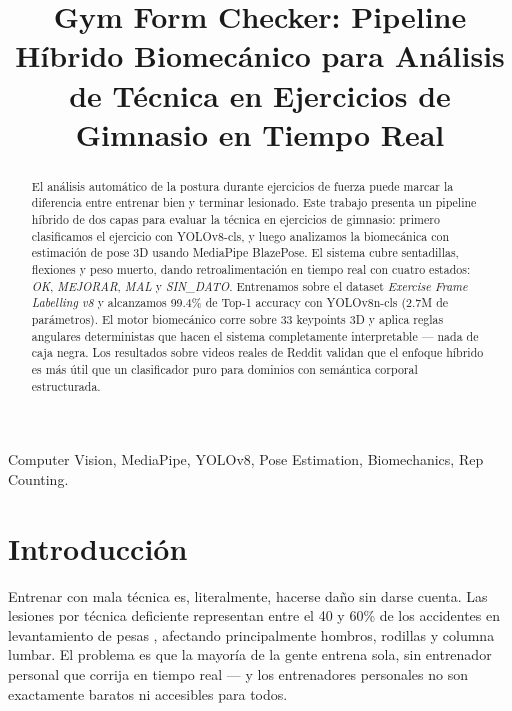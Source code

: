 \documentclass[conference]{IEEEtran}
\begin{document}
\title{Gym Form Checker: Pipeline Híbrido Biomecánico para Análisis de Técnica en Ejercicios de Gimnasio en Tiempo Real}

\author{
}

\maketitle

\begin{abstract}
El análisis automático de la postura durante ejercicios de fuerza puede marcar la diferencia entre entrenar bien y terminar lesionado. Este trabajo presenta un pipeline híbrido de dos capas para evaluar la técnica en ejercicios de gimnasio: primero clasificamos el ejercicio con YOLOv8-cls, y luego analizamos la biomecánica con estimación de pose 3D usando MediaPipe BlazePose. El sistema cubre sentadillas, flexiones y peso muerto, dando retroalimentación en tiempo real con cuatro estados: \textit{OK}, \textit{MEJORAR}, \textit{MAL} y \textit{SIN\_DATO}. Entrenamos sobre el dataset \textit{Exercise Frame Labelling v8} y alcanzamos 99.4\% de Top-1 accuracy con YOLOv8n-cls (2.7M de parámetros). El motor biomecánico corre sobre 33 keypoints 3D y aplica reglas angulares deterministas que hacen el sistema completamente interpretable — nada de caja negra. Los resultados sobre videos reales de Reddit validan que el enfoque híbrido es más útil que un clasificador puro para dominios con semántica corporal estructurada.
\end{abstract}

\begin{IEEEkeywords}
Computer Vision, MediaPipe, YOLOv8, Pose Estimation, Biomechanics, Rep Counting.
\end{IEEEkeywords}

\section{Introducción}

Entrenar con mala técnica es, literalmente, hacerse daño sin darse cuenta. Las lesiones por técnica deficiente representan entre el 40 y 60\% de los accidentes en levantamiento de pesas \cite{ref1}, afectando principalmente hombros, rodillas y columna lumbar. El problema es que la mayoría de la gente entrena sola, sin entrenador personal que corrija en tiempo real — y los entrenadores personales no son exactamente baratos ni accesibles para todos.
\end{document}
